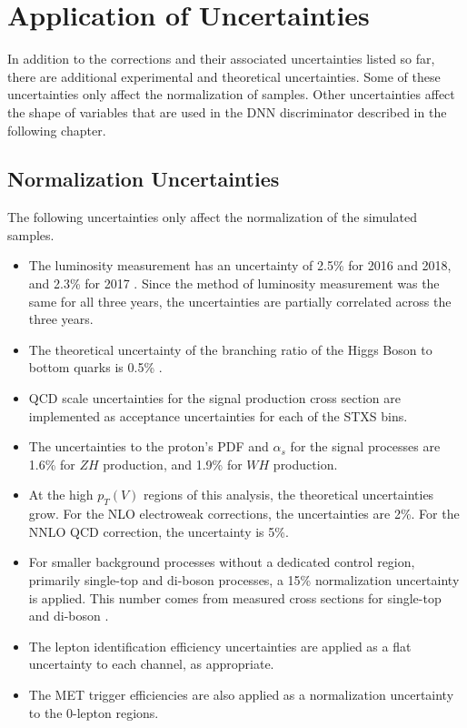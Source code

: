 \section{Application of Uncertainties}

In addition to the corrections and their associated uncertainties listed so far,
there are additional experimental and theoretical uncertainties.
Some of these uncertainties only affect the normalization of samples.
Other uncertainties affect the shape of variables that are used in the DNN
discriminator described in the following chapter.

\subsection{Normalization Uncertainties}

The following uncertainties only affect the normalization of the simulated samples.
\begin{itemize}
\item The luminosity measurement has an uncertainty of
  2.5\% for 2016 and 2018, and 2.3\% for 2017
  \cite{CMS-PAS-LUM-17-001,CMS-PAS-LUM-17-004,CMS-PAS-LUM-18-002}.
  Since the method of luminosity measurement was the same for all three years,
  the uncertainties are partially correlated across the three years.
\item The theoretical uncertainty of the branching ratio of the Higgs Boson
  to bottom quarks is 0.5\% \cite{DeFlorianSabaris:2215893}.
\item QCD scale uncertainties for the signal production cross section
  are implemented as acceptance uncertainties for each of the STXS bins.
\item The uncertainties to the proton's PDF and $\alpha_s$ for the signal processes
  are 1.6\% for $Z\!H$ production, and 1.9\% for $W\!H$ production.
\item At the high $p_T(V)$ regions of this analysis, the theoretical uncertainties grow.
  For the NLO electroweak corrections, the uncertainties are 2\%.
  For the NNLO QCD correction, the uncertainty is 5\%.
\item For smaller background processes without a dedicated control region,
  primarily single-top and di-boson processes, a 15\% normalization uncertainty is applied.
  This number comes from measured cross sections for single-top \cite{2017752}
  and di-boson \cite{2017533}.
\item The lepton identification efficiency uncertainties are applied as a flat uncertainty
  to each channel, as appropriate.
\item The MET trigger efficiencies are also applied as a normalization uncertainty
  to the 0-lepton regions.
\end{itemize}

